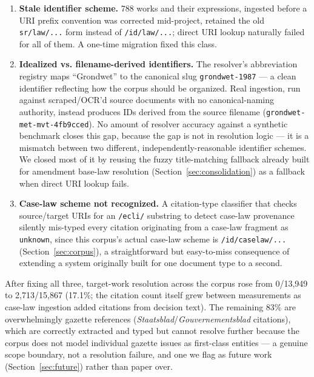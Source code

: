\documentclass{IOS-Book-Article}
\begin{document}
\begingroup\sloppy
\begin{enumerate}
\item \textbf{Stale identifier scheme.} 788 works and their expressions, ingested before a URI
   prefix convention was corrected mid-project, retained the old \texttt{sr/law/...} form instead
   of \texttt{/id/law/...}; direct URI lookup naturally failed for all of them. A one-time migration
   fixed this class.
\item \textbf{Idealized vs. filename-derived identifiers.} The resolver's abbreviation registry maps
   ``Grondwet'' to the canonical slug \texttt{grondwet-1987} --- a clean identifier reflecting how the
   corpus should be organized. Real ingestion, run against scraped/OCR'd source documents
   with no canonical-naming authority, instead produces IDs derived from the source filename
   (\texttt{grondwet-met-mvt-\allowbreak{}4fb9cced}). No amount of resolver accuracy against a synthetic
   benchmark closes this gap, because the gap is not in resolution logic --- it is a mismatch
   between two different, independently-reasonable identifier schemes. We closed most of it
   by reusing the fuzzy title-matching fallback already built for amendment base-law
   resolution (Section~\ref{sec:consolidation}) as a fallback when direct URI lookup fails.
\item \textbf{Case-law scheme not recognized.} A citation-type classifier that checks source/target
   URIs for an \texttt{/ecli/} substring to detect case-law provenance silently mis-typed every
   citation originating from a case-law fragment as \texttt{unknown}, since this corpus's actual
   case-law scheme is \texttt{/id/caselaw/...} (Section~\ref{sec:corpus}), a straightforward
   but easy-to-miss consequence of extending a system originally built for one document type to a second.
\end{enumerate}
\endgroup

After fixing all three, target-work resolution across the corpus rose from 0/13,949 to
2,713/15,867 (17.1\%; the citation count itself grew between measurements as case-law
ingestion added citations from decision text). The remaining 83\% are overwhelmingly gazette
references (\emph{Staatsblad}/\emph{Gouvernementsblad} citations), which are correctly extracted and
typed but cannot resolve further because the corpus does not model individual gazette issues
as first-class entities --- a genuine scope boundary, not a resolution failure, and one we
flag as future work (Section~\ref{sec:future}) rather than paper over.
\end{document}
